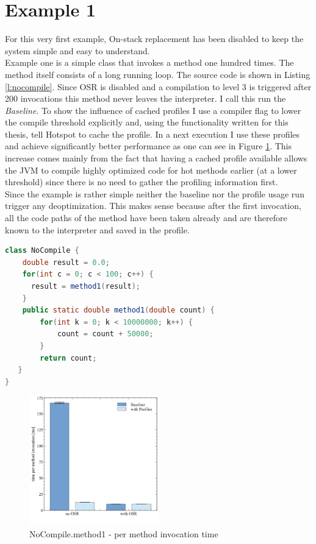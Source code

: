 \section{Example 1}
\label{s:ex1}
For this very first example, On-stack replacement has been disabled to keep the system simple and easy to understand.
\\
Example one is a simple class that invokes a method one hundred times. The method itself consists of a long running loop. The source code is shown in Listing \ref{l:nocompile}.
Since OSR is disabled and a compilation to level 3 is triggered after 200 invocations this method never leaves the interpreter. I call this run the \textit{Baseline}.
To show the influence of cached profiles I use a compiler flag to lower the compile threshold explicitly and, using the functionality written for this thesis, tell Hotspot to cache the profile.
In a next execution I use these profiles and achieve significantly better performance as one can see in Figure \ref{f:nocompile}.
This increase comes mainly from the fact that having a cached profile available allows the JVM to compile highly optimized code for hot methods earlier (at a lower threshold) since there is no need to gather the profiling information first.
\\
Since the example is rather simple neither the baseline nor the profile usage run trigger any deoptimization. This makes sense because after the first invocation, all the code paths of the method have been taken already and are therefore known to the interpreter and saved in the profile.
\begin{lstlisting}[float,caption=Simple method that does not get compiled,label=l:nocompile,language=Java]
class NoCompile {
    double result = 0.0;
    for(int c = 0; c < 100; c++) {
      result = method1(result);
    }
    public static double method1(double count) {
        for(int k = 0; k < 10000000; k++) {
            count = count + 50000;
        }
        return count;
   }
}
\end{lstlisting}
\begin{figure}[ht]
  \begin{center}
    \centering
    \includegraphics[width=0.5\textwidth]{figures/nocompile.png}
    \caption{NoCompile.method1 - per method invocation time}
    \label{f:nocompile}
  \end{center}
\end{figure}
